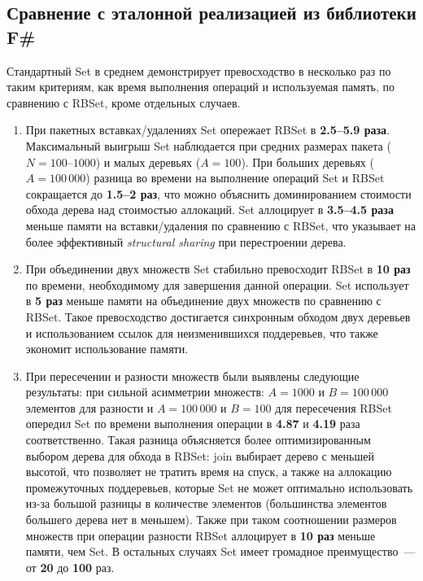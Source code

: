 \documentclass[a4paper]{article}
\begin{document}
\subsection{Сравнение с эталонной реализацией из библиотеки F\#}
Стандартный Set в среднем демонстрирует превосходство в несколько раз по таким критериям, как время выполнения операций и используемая память, 
по сравнению с RBSet, кроме отдельных случаев.
\begin{enumerate}
    \item При пакетных вставках/удалениях Set опережает RBSet в \textbf{2.5--5.9 раза}.
          Максимальный выигрыш Set наблюдается при средних размерах
          пакета ($N = 100$--$1000$) и малых деревьях ($A = 100$).
          При больших деревьях ($A = 100\,000$) разница во времени на выполнение 
          операций Set и RBSet сокращается до \textbf{1.5–2 раз}, что можно объяснить 
          доминированием стоимости обхода дерева над стоимостью аллокаций.
          Set аллоцирует в \textbf{3.5--4.5 раза}
          меньше памяти на вставки/удаления по сравнению с RBSet, 
          что указывает на более эффективный
          \textit{structural sharing} при перестроении дерева.
    \item При объединении двух множеств Set стабильно превосходит RBSet в \textbf{10 раз} по времени, необходимому для 
          завершения данной операции.
          Set использует в \textbf{5 раз} меньше памяти на объединение двух множеств по сравнению с RBSet.
          Такое превосходство достигается синхронным обходом двух деревьев и использованием ссылок для неизменившихся поддеревьев, 
          что также экономит использование памяти.
    \item При пересечении и разности множеств были выявлены следующие результаты: 
          при сильной асимметрии множеств: $A = 1000$ и $B = 100\,000$ элементов для разности и 
           $A = 100\,000$ и $B = 100$ для пересечения RBSet опередил Set по времени выполнения операции в \textbf{4.87} и \textbf{4.19} раза соответственно.
           Такая разница объясняется более оптимизированным выбором дерева для обхода в RBSet: join выбирает дерево с меньшей высотой, что позволяет не тратить 
           время на спуск, а также на аллокацию промежуточных поддеревьев, которые Set не может оптимально использовать из-за большой разницы в количестве 
           элементов (большинства элементов большего дерева нет в меньшем). Также при таком соотношении размеров множеств при операции разности RBSet аллоцирует 
           в \textbf{10 раз} меньше памяти, чем Set. В остальных случаях Set имеет громадное преимущество~--- от \textbf{20} до \textbf{100} раз.
\end{enumerate}  
\end{document}
